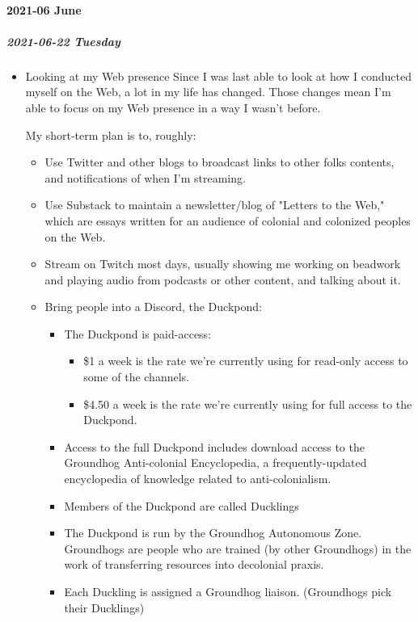 \documentclass[11pt]{article}
\begin{document}
\paragraph*{2021-06 June}
\label{sec:org2146c28}
\startcontents[level-4]
\subparagraph*{2021-06-22 Tuesday}
\label{sec:org441101e}
\begin{itemize}
\item Looking at my Web presence
\label{sec:org27541d5}
Since I was last able to look at how I conducted myself on the Web, a lot in my life has changed. Those changes mean I'm able to focus on my Web presence in a way I wasn't before.

My short-term plan is to, roughly:

\begin{itemize}
\item Use Twitter and other blogs to broadcast links to other folks contents, and notifications of when I'm streaming.
\item Use Substack to maintain a newsletter/blog of "Letters to the Web," which are essays written for an audience of colonial and colonized peoples on the Web.
\item Stream on Twitch most days, usually showing me working on beadwork and playing audio from podcasts or other content, and talking about it.
\item Bring people into a Discord, the Duckpond:
\begin{itemize}
\item The Duckpond is paid-access:
\begin{itemize}
\item \$1 a week is the rate we're currently using for read-only access to some of the channels.
\item \$4.50 a week is the rate we're currently using for full access to the Duckpond.
\end{itemize}
\item Access to the full Duckpond includes download access to the Groundhog Anti-colonial Encyclopedia, a frequently-updated encyclopedia of knowledge related to anti-colonialism.
\item Members of the Duckpond are called Ducklings
\item The Duckpond is run by the Groundhog Autonomous Zone. Groundhogs are people who are trained (by other Groundhogs) in the work of transferring resources into decolonial praxis.
\item Each Duckling is assigned a Groundhog liaison. (Groundhogs pick their Ducklings)

\end{itemize}
\end{itemize}
\end{itemize}
\end{document}
